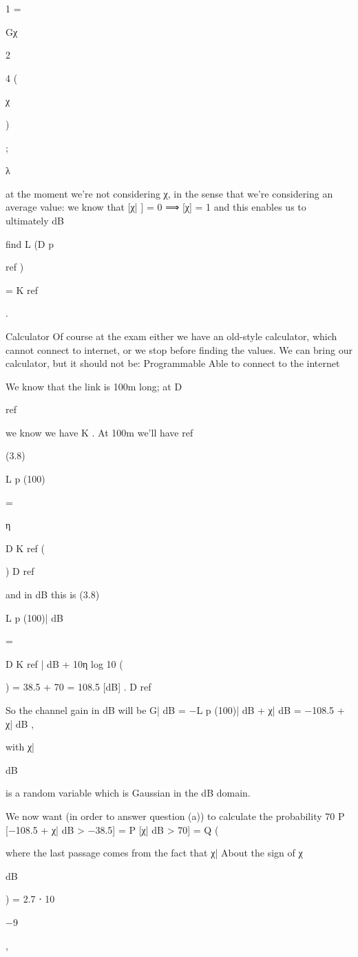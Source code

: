 {{{{1
=

Gχ

2

4\pid
(

χ

)

;

λ

at the moment we're not considering χ, in the sense that we're considering an average value: we know that [χ| ] = 0 ⟹ [χ] = 1 and this enables us to ultimately dB

find L (D p

ref )

= K ref

.

Calculator Of course at the exam either we have an old-style calculator, which cannot connect to internet, or we stop before finding the values.
We can bring our calculator, but it should not be:
Programmable Able to connect to the internet

We know that the link is 100m long; at D

ref

we know we have K . At 100m we'll have ref

(3.8)

L p (100)

=

η

D K ref (

)
D ref

and in dB this is
(3.8)

L p (100)| dB

=

D K ref | dB + 10η log 10 (

) = 38.5 + 70 = 108.5 [dB] .
D ref

So the channel gain in dB will be G| dB = −L p (100)| dB + χ| dB = −108.5 + χ| dB ,

with χ|

dB

is a random variable which is Gaussian in the dB domain.

We now want (in order to answer question (a)) to calculate the probability 70 P [−108.5 + χ| dB > −38.5] = P [χ| dB > 70] = Q (

where the last passage comes from the fact that χ|
​About the sign of χ

dB

) = 2.7 ⋅ 10

−9

,

}}}}
